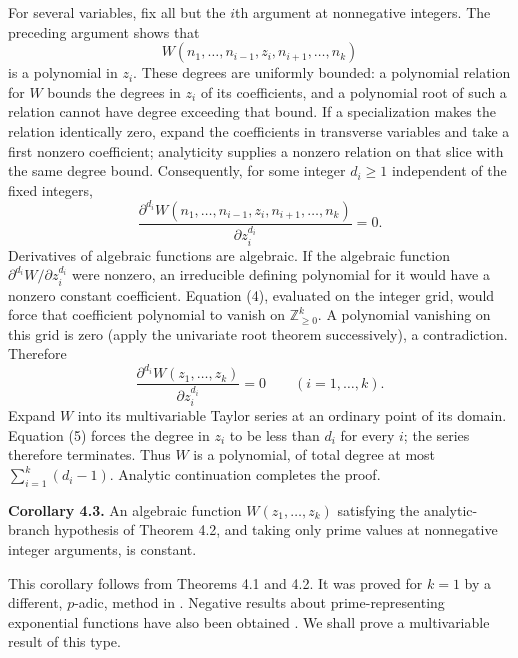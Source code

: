 \documentclass[10pt,letterpaper]{article}
\newcommand{\Nzero}{\mathbb{Z}_{\geq 0}}
\newcommand{\statement}[1]{\par\medskip\noindent\textbf{#1}\enspace}
\begin{document}
For several variables, fix all but the $i$th argument at nonnegative integers.
The preceding argument shows that
\begin{equation*}
W(n_1,\ldots,n_{i-1},z_i,n_{i+1},\ldots,n_k)\tag{3}
\end{equation*}
is a polynomial in $z_i$. These degrees are uniformly bounded: a polynomial relation
for $W$ bounds the degrees in $z_i$ of its coefficients, and a polynomial root of such
a relation cannot have degree exceeding that bound. If a specialization makes the relation
identically zero, expand the coefficients in transverse variables and take a first nonzero
coefficient; analyticity supplies a nonzero relation on that slice with the same degree bound.
Consequently, for some integer $d_i\geq1$ independent of the fixed integers,
\begin{equation*}
\frac{\partial^{d_i}W(n_1,\ldots,n_{i-1},z_i,n_{i+1},\ldots,n_k)}
{\partial z_i^{d_i}}=0.\tag{4}
\end{equation*}
Derivatives of algebraic functions are algebraic. If the algebraic function
$\partial^{d_i}W/\partial z_i^{d_i}$ were nonzero, an irreducible defining polynomial
for it would have a nonzero constant coefficient. Equation (4), evaluated on the integer
grid, would force that coefficient polynomial to vanish on $\Nzero^k$.
A polynomial vanishing on this grid is zero (apply the univariate root theorem successively),
a contradiction. Therefore
\begin{equation*}
\frac{\partial^{d_i}W(z_1,\ldots,z_k)}{\partial z_i^{d_i}}=0
\qquad (i=1,\ldots,k).\tag{5}
\end{equation*}
Expand $W$ into its multivariable Taylor series at an ordinary point of its domain.
Equation (5) forces the degree in $z_i$ to be less than $d_i$ for every $i$;
the series therefore terminates. Thus $W$ is a polynomial, of total degree at most
$\sum_{i=1}^k(d_i-1)$. Analytic continuation completes the proof.

\statement{Corollary 4.3.} An algebraic function $W(z_1,\ldots,z_k)$ satisfying the analytic-branch hypothesis of Theorem 4.2, and taking only prime values at nonnegative integer arguments, is constant.

This corollary follows from Theorems 4.1 and 4.2. It was proved for $k=1$ by a different, $p$-adic, method in \cite{ref18}. Negative results about prime-representing exponential functions have also been obtained \cite{ref13} \cite{ref18} \cite{ref20}. We shall prove a multivariable result of this type.
\end{document}
